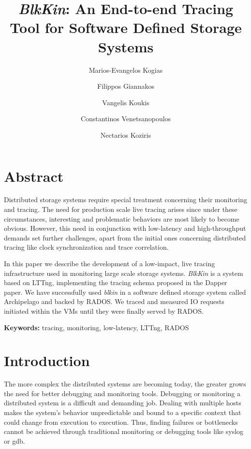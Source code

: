 \documentclass[a4paper,10pt,twocolumn]{article}
\begin{document}
\title{\emph{BlkKin}: An End-to-end Tracing Tool for Software Defined Storage 
Systems}
\author[1]{Marios-Evangelos Kogias}
\author[1]{Filippos Giannakos}
\author[1]{Vangelis Koukis}
\author[2]{Constantinos Venetsanopoulos}
\author[1]{Nectarios Koziris}
\date{}
\maketitle

\section*{Abstract}
Distributed storage systems require special treatment concerning their
monitoring and tracing. The need for production scale live tracing arises since
under these circumstances, interesting and problematic behaviors are most likely
to become obvious. However, this need in conjunction with low-latency and
high-throughput demands set further challenges, apart from the initial ones
concerning distributed tracing like clock synchronization and trace correlation.

In this paper we describe the development of a low-impact, live tracing
infrastructure used in monitoring large scale storage systems. \emph{BlkKin} is
a system based on LTTng\cite{lttng}, implementing the tracing schema proposed in
the Dapper paper\cite{dapper}. We have successfully used \emph{blkin} in a
software defined storage system called Archipelago\cite{archip} and  backed by
RADOS\cite{rados}. We traced and measured IO requests initiated within the VMs
until they were finally served by RADOS.


\textbf{Keywords: } tracing, monitoring, low-latency, LTTng, RADOS

\section{Introduction}

The more complex the distributed systems are becoming today, the greater grows
the need for better debugging and monitoring tools. Debugging or monitoring a
distributed system is a difficult and demanding job. Dealing with multiple hosts
makes the system's behavior unpredictable and bound to a specific context that
could change from execution to execution. Thus, finding failures or bottlenecks
cannot be achieved through traditional monitoring or debugging tools like syslog
or gdb.  
\end{document}
